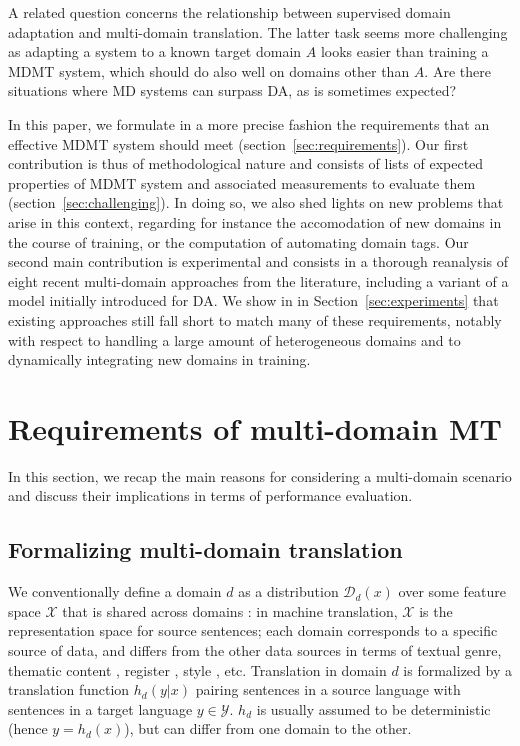 \documentclass[11pt,a4paper]{article}
\newcommand{\fyDone}[1]{\done[FY]\Todo[FY:]{\textcolor{orange}{#1}}}
\begin{document}
A related question concerns the relationship between supervised domain adaptation and multi-domain translation. The latter task seems more challenging as adapting a system to a known target domain $A$ looks easier than training a MDMT system, which should do also well on domains other than $A$. Are there situations where MD systems can surpass DA, as is sometimes expected?
 
In this paper, we formulate in a more precise fashion the requirements that an effective MDMT system should meet (section~\ref{sec:requirements}). Our first contribution is thus of methodological nature and consists of lists of expected properties of MDMT system and associated measurements to evaluate them (section~\ref{sec:challenging}). In doing so, we also shed lights on new problems that arise in this context, regarding for instance the accomodation of new domains in the course of training, or the computation of automating domain tags.\fyDone{New problems - continuous learning, automatic domains} Our second main contribution is experimental and consists in a thorough reanalysis of eight recent multi-domain approaches from the literature, including a variant of a model initially introduced for DA. We show in in Section~\ref{sec:experiments} that existing approaches still fall short to match many of these requirements, notably with respect to handling a large amount of heterogeneous domains and to dynamically integrating new domains in training.\fyDone{Spell out conclusions}
 
\section{Requirements of multi-domain MT \label{sec:requirements}}
In this section, we recap the main reasons for considering a multi-domain scenario and discuss their implications in terms of performance evaluation.
\fyDone{Relation to theory, discussion of worst case scenario}
\fyDone{Insist on the work of Dredze}

\subsection{Formalizing multi-domain translation \label{ssec:formalization}}

We conventionally define a domain $d$ as a distribution $\mathcal{D}_d(x)$ over some feature space $\mathcal{X}$ that is shared across domains \cite{Pan10asurvey}: in machine translation, $\mathcal{X}$ is the representation space for source sentences; each domain corresponds to a specific source of data, and differs from the other data sources in terms of textual genre, thematic content \cite{Chen16guided,Zhang16topicinformed}, register \cite{Sennrich16politeness}, style \cite{Niu18multitask}, etc. Translation in domain $d$ is formalized by a translation function $h_d(y|x)$ pairing sentences in a source language with sentences in a target language $y \in \mathcal{Y}$. $h_d$ is usually assumed to be deterministic (hence $y = h_d(x)$), but can differ from one domain to the other.
\end{document}
